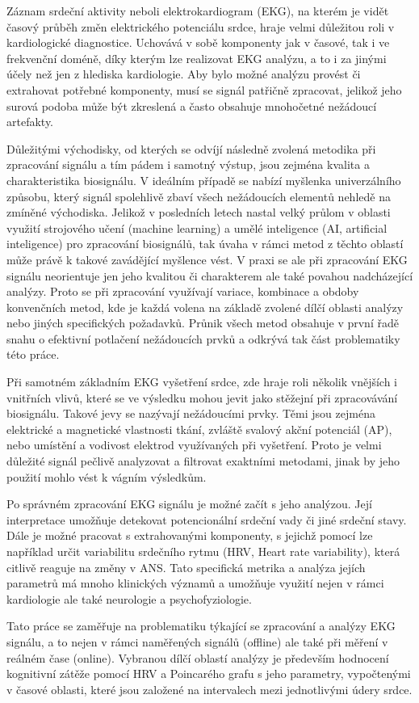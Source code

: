 Záznam srdeční aktivity neboli elektrokardiogram (EKG), na kterém je vidět
časový průběh změn elektrického potenciálu srdce, hraje velmi důležitou roli v
kardiologické diagnostice. Uchovává v sobě komponenty jak v časové, tak i ve
frekvenční doméně, díky kterým lze realizovat EKG analýzu, a to i za jinými
účely než jen z hlediska kardiologie. Aby bylo možné analýzu provést či
extrahovat potřebné komponenty, musí se signál patřičně zpracovat, jelikož jeho
surová podoba může být zkreslená a často obsahuje mnohočetné nežádoucí
artefakty.

Důležitými východisky, od kterých se odvíjí následně zvolená metodika při
zpracování signálu a tím pádem i samotný výstup, jsou zejména kvalita a
charakteristika biosignálu. V ideálním případě se nabízí myšlenka univerzálního
způsobu, který signál spolehlivě zbaví všech nežádoucích elementů nehledě na
zmíněné východiska. Jelikož v posledních letech nastal velký průlom v oblasti
využití strojového učení (machine learning) a umělé inteligence (AI, artificial
inteligence) pro zpracování biosignálů, tak úvaha v rámci metod z těchto oblastí
může právě k takové zavádějící myšlence vést. V praxi se ale při zpracování EKG
signálu neorientuje jen jeho kvalitou či charakterem ale také povahou
nadcházející analýzy. Proto se při zpracování využívají variace, kombinace a
obdoby konvenčních metod, kde je každá volena na základě zvolené dílčí oblasti
analýzy nebo jiných specifických požadavků. Průnik všech metod obsahuje v první
řadě snahu o efektivní potlačení nežádoucích prvků a odkrývá tak část
problematiky této práce.

Při samotném základním EKG vyšetření srdce, zde hraje roli několik vnějších i
vnitřních vlivů, které se ve výsledku mohou jevit jako stěžejní při zpracovávání
biosignálu. Takové jevy se nazývají nežádoucími prvky. Těmi jsou zejména
elektrické a magnetické vlastnosti tkání, zvláště svalový akční potenciál (AP),
nebo umístění a vodivost elektrod využívaných při vyšetření. Proto je velmi
důležité signál pečlivě analyzovat a filtrovat exaktními metodami, jinak by jeho
použití mohlo vést k vágním výsledkům. 

Po správném zpracování EKG signálu je možné začít s jeho analýzou. Její
interpretace umožňuje detekovat potencionální srdeční vady či jiné srdeční
stavy. Dále je možné pracovat s extrahovanými komponenty, s jejichž pomocí lze
například určit variabilitu srdečního rytmu (HRV, Heart rate variability), která
citlivě reaguje na změny v ANS. Tato specifická metrika a analýza jejích
parametrů má mnoho klinických významů a umožňuje využití nejen v rámci
kardiologie ale také neurologie a psychofyziologie.

Tato práce se zaměřuje na problematiku týkající se zpracování a analýzy EKG
signálu, a to nejen v rámci naměřených signálů (offline) ale také při měření v
reálném čase (online). Vybranou dílčí oblastí analýzy je především hodnocení
kognitivní zátěže pomocí HRV a Poincarého grafu s jeho parametry, vypočtenými v
časové oblasti, které jsou založené na intervalech mezi jednotlivými údery
srdce.

